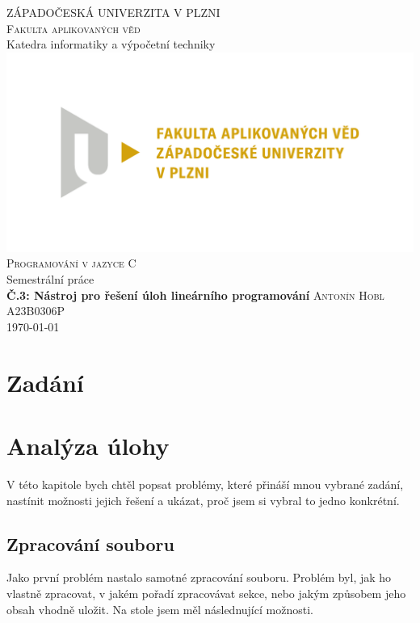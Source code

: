 \documentclass[a4paper,12pt,oneside]{report}
\begin{document}
\begin{titlepage}
	\Large
	\begin{center}
		\textsc{ZÁPADOČESKÁ UNIVERZITA V PLZNI}\\
		\textsc{Fakulta aplikovaných věd}\\
		Katedra informatiky a výpočetní techniky\\
		\vspace{.5cm}
		\includegraphics[width=\textwidth]{pdfs/FAV_logo.pdf}
		\vspace{.5cm}
		\textsc{Programování v jazyce C}\\
		Semestrální práce\\
		\textbf{Č.3: Nástroj pro řešení úloh lineárního programování}
		\vfill
		\textsc{Antonín Hobl} \hfill A23B0306P\\
		\raggedleft\textsc{\today}
	\end{center}
\end{titlepage}

\tableofcontents

\chapter{Zadání}



\chapter{Analýza úlohy}

V této kapitole bych chtěl popsat problémy, které přináší mnou vybrané zadání, nastínit možnosti jejich řešení a
ukázat, proč jsem si vybral to jedno konkrétní.

\section{Zpracování souboru}
Jako první problém nastalo samotné zpracování souboru. Problém byl, jak ho vlastně zpracovat, v jakém pořadí zpracovávat sekce, nebo jakým způsobem
jeho obsah vhodně uložit. Na stole jsem měl následnující možnosti.
\end{document}
